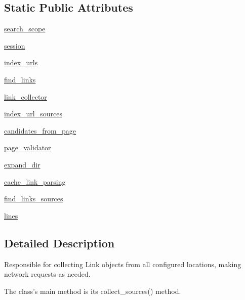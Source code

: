 \subsection*{Static Public Attributes}
\begin{DoxyCompactItemize}
\item 
\hyperlink{classpip_1_1__internal_1_1index_1_1collector_1_1LinkCollector_a88b69ba28b46c6d958a0c2833f6c0fbe}{search\+\_\+scope}
\item 
\hyperlink{classpip_1_1__internal_1_1index_1_1collector_1_1LinkCollector_aec81e6d9b133b756c0ac7b9293b2951b}{session}
\item 
\hyperlink{classpip_1_1__internal_1_1index_1_1collector_1_1LinkCollector_a8ff0e2fdedc5089ee9334a6c3f055f47}{index\+\_\+urls}
\item 
\hyperlink{classpip_1_1__internal_1_1index_1_1collector_1_1LinkCollector_a219a8d8504bf869af902a069f2829fd4}{find\+\_\+links}
\item 
\hyperlink{classpip_1_1__internal_1_1index_1_1collector_1_1LinkCollector_a5107e590268fe072e0ef88737c1077df}{link\+\_\+collector}
\item 
\hyperlink{classpip_1_1__internal_1_1index_1_1collector_1_1LinkCollector_a62a441e52bb531e19e254c25bff26e41}{index\+\_\+url\+\_\+sources}
\item 
\hyperlink{classpip_1_1__internal_1_1index_1_1collector_1_1LinkCollector_ac55ba27bdf518b73acd48812ab1f6091}{candidates\+\_\+from\+\_\+page}
\item 
\hyperlink{classpip_1_1__internal_1_1index_1_1collector_1_1LinkCollector_a2526ab46ea629b014c13a64ae23c2a01}{page\+\_\+validator}
\item 
\hyperlink{classpip_1_1__internal_1_1index_1_1collector_1_1LinkCollector_abce5127bc65bbde59aadb9fa2fece7be}{expand\+\_\+dir}
\item 
\hyperlink{classpip_1_1__internal_1_1index_1_1collector_1_1LinkCollector_a44c0100cb2b100171655f5bead5d9b90}{cache\+\_\+link\+\_\+parsing}
\item 
\hyperlink{classpip_1_1__internal_1_1index_1_1collector_1_1LinkCollector_a977417749079aa0b0a3ac340342cbec4}{find\+\_\+links\+\_\+sources}
\item 
\hyperlink{classpip_1_1__internal_1_1index_1_1collector_1_1LinkCollector_a77b7aaad7601d2ff8592ecd7014408aa}{lines}
\end{DoxyCompactItemize}


\subsection{Detailed Description}
\begin{DoxyVerb}Responsible for collecting Link objects from all configured locations,
making network requests as needed.

The class's main method is its collect_sources() method.
\end{DoxyVerb}
 

